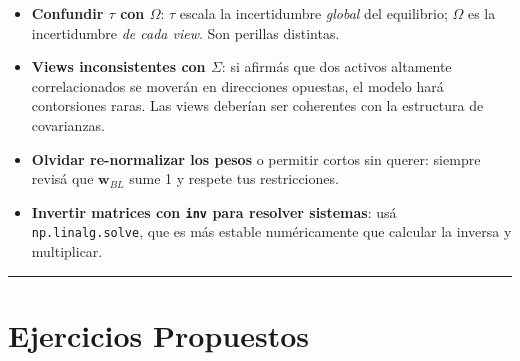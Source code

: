 \documentclass[
  spanish,
  letterpaper,
  DIV=11,
  numbers=noendperiod]{scrreprt}
\providecommand{\tightlist}{%
  \setlength{\itemsep}{0pt}\setlength{\parskip}{0pt}}
\begin{document}
\begin{tcolorbox}[enhanced jigsaw, bottomrule=.15mm, colback=white, opacitybacktitle=0.6, arc=.35mm, toprule=.15mm, opacityback=0, breakable, titlerule=0mm, left=2mm, coltitle=black, colbacktitle=quarto-callout-warning-color!10!white, colframe=quarto-callout-warning-color-frame, leftrule=.75mm, toptitle=1mm, bottomtitle=1mm, title=\textcolor{quarto-callout-warning-color}{\faExclamationTriangle}\hspace{0.5em}{Trampas frecuentes}, rightrule=.15mm]

\begin{itemize}
\tightlist
\item
  \textbf{Confundir \(\tau\) con \(\Omega\)}: \(\tau\) escala la
  incertidumbre \emph{global} del equilibrio; \(\Omega\) es la
  incertidumbre \emph{de cada view}. Son perillas distintas.
\item
  \textbf{Views inconsistentes con \(\Sigma\)}: si afirmás que dos
  activos altamente correlacionados se moverán en direcciones opuestas,
  el modelo hará contorsiones raras. Las views deberían ser coherentes
  con la estructura de covarianzas.
\item
  \textbf{Olvidar re-normalizar los pesos} o permitir cortos sin querer:
  siempre revisá que \(\mathbf{w}_{BL}\) sume 1 y respete tus
  restricciones.
\item
  \textbf{Invertir matrices con \texttt{inv} para resolver sistemas}:
  usá \texttt{np.linalg.solve}, que es más estable numéricamente que
  calcular la inversa y multiplicar.
\end{itemize}

\end{tcolorbox}

\begin{center}\rule{0.5\linewidth}{0.5pt}\end{center}

\chapter{Ejercicios Propuestos}\label{ejercicios-propuestos-9}
\end{document}
